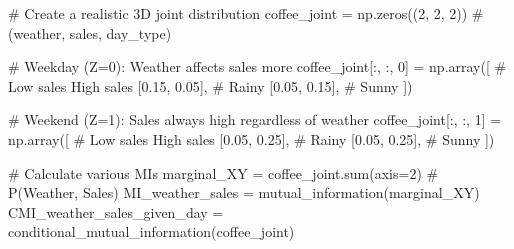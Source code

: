 \documentclass[
  11pt,
  letterpaper,
  oneside,
  openany]{book}
\newenvironment{Shaded}{\begin{snugshade}}{\end{snugshade}}
\newcommand{\BuiltInTok}[1]{\textcolor[rgb]{0.00,0.23,0.31}{#1}}
\newcommand{\CommentTok}[1]{\textcolor[rgb]{0.37,0.37,0.37}{#1}}
\newcommand{\DecValTok}[1]{\textcolor[rgb]{0.68,0.00,0.00}{#1}}
\newcommand{\FloatTok}[1]{\textcolor[rgb]{0.68,0.00,0.00}{#1}}
\newcommand{\NormalTok}[1]{\textcolor[rgb]{0.00,0.23,0.31}{#1}}
\newcommand{\OperatorTok}[1]{\textcolor[rgb]{0.37,0.37,0.37}{#1}}
\begin{document}
\begin{Shaded}
\begin{Highlighting}[]
\CommentTok{\# Create a realistic 3D joint distribution}
\NormalTok{coffee\_joint }\OperatorTok{=}\NormalTok{ np.zeros((}\DecValTok{2}\NormalTok{, }\DecValTok{2}\NormalTok{, }\DecValTok{2}\NormalTok{))  }\CommentTok{\# (weather, sales, day\_type)}

\CommentTok{\# Weekday (Z=0): Weather affects sales more}
\NormalTok{coffee\_joint[:, :, }\DecValTok{0}\NormalTok{] }\OperatorTok{=}\NormalTok{ np.array([}
    \CommentTok{\# Low sales  High sales}
\NormalTok{    [}\FloatTok{0.15}\NormalTok{,       }\FloatTok{0.05}\NormalTok{],  }\CommentTok{\# Rainy}
\NormalTok{    [}\FloatTok{0.05}\NormalTok{,       }\FloatTok{0.15}\NormalTok{],  }\CommentTok{\# Sunny}
\NormalTok{])}

\CommentTok{\# Weekend (Z=1): Sales always high regardless of weather}
\NormalTok{coffee\_joint[:, :, }\DecValTok{1}\NormalTok{] }\OperatorTok{=}\NormalTok{ np.array([}
    \CommentTok{\# Low sales  High sales}
\NormalTok{    [}\FloatTok{0.05}\NormalTok{,       }\FloatTok{0.25}\NormalTok{],  }\CommentTok{\# Rainy}
\NormalTok{    [}\FloatTok{0.05}\NormalTok{,       }\FloatTok{0.25}\NormalTok{],  }\CommentTok{\# Sunny}
\NormalTok{])}

\CommentTok{\# Calculate various MIs}
\NormalTok{marginal\_XY }\OperatorTok{=}\NormalTok{ coffee\_joint.}\BuiltInTok{sum}\NormalTok{(axis}\OperatorTok{=}\DecValTok{2}\NormalTok{)  }\CommentTok{\# P(Weather, Sales)}
\NormalTok{MI\_weather\_sales }\OperatorTok{=}\NormalTok{ mutual\_information(marginal\_XY)}
\NormalTok{CMI\_weather\_sales\_given\_day }\OperatorTok{=}\NormalTok{ conditional\_mutual\_information(coffee\_joint)}


\end{Highlighting}
\end{Shaded}
\end{document}

